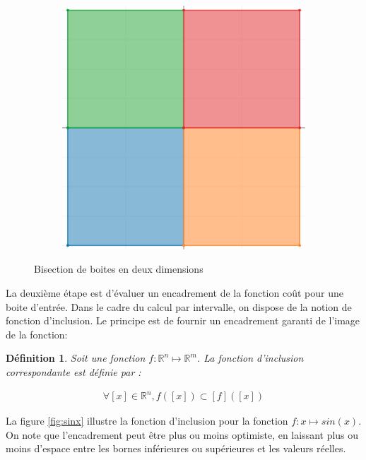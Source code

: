 \documentclass[12pt,a4paper]{article}
\newtheorem{definition}{Définition}
\begin{document}
\begin{figure}[H]
        \begin{subfigure}[t]{0.3\textwidth}
            \centering
            \includegraphics[scale=0.2]{bisect_2.png}
        \end{subfigure}
        \caption{Bisection de boites en deux dimensions}
        \label{fig:bisect}
    \end{figure}

    La deuxième étape est d'évaluer un encadrement de la fonction coût pour une boite d'entrée. Dans le cadre du calcul par intervalle, on dispose de la notion de fonction d'inclusion. Le principe est de fournir un encadrement garanti de l'image de la fonction:

    \begin{definition}
        Soit une fonction $f : \mathbb{R}^n \mapsto \mathbb{R}^m $. La fonction d'inclusion correspondante est définie par :

        \begin{align}\forall[x] \in \mathbb{R}^n , f([x]) \subset [f]([x])\end{align}
    \end{definition}
    
    La figure \ref{fig:sinx} illustre la fonction d'inclusion pour la fonction $ f : x \mapsto sin(x)$. On note que l'encadrement peut être plus ou moins optimiste, en laissant plus ou moins d'espace entre les bornes inférieures ou supérieures et les valeurs réelles.

\end{document}
